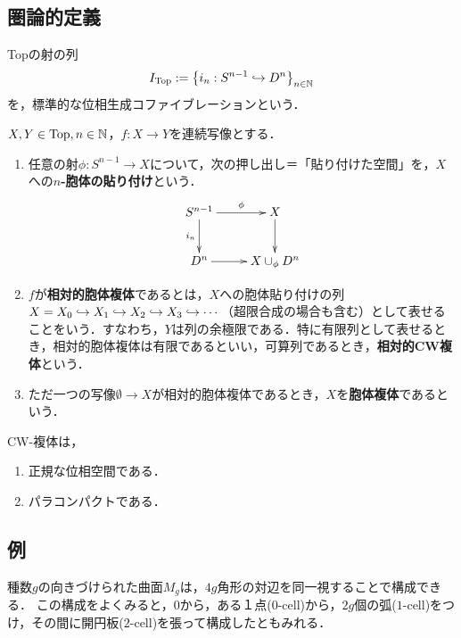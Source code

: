 \documentclass[uplatex,dvipdfmx]{jsreport}
\begin{document}
\subsection{圏論的定義}

\begin{notation}
    Topの射の列
    \[I_{\mathrm{Top}}:=\left\{i_n:S^{n-1}\hookrightarrow D^n\right\}_{n\in\mathbb{N}}\]
    を，標準的な位相生成コファイブレーションという．
\end{notation}

\begin{definition}
    $X,Y\in\mathrm{Top},n\in\mathbb{N}$，$f:X\to Y$を連続写像とする．
    \begin{enumerate}
        \item 任意の射$\phi:S^{n-1}\to X$について，次の押し出し＝「貼り付けた空間」を，$X$への\textbf{$n$-胞体の貼り付け}という．
        \[\xymatrix{
            S^{n-1}\ar[r]^-{\phi}\ar[d]_-{i_n}&X\ar[d]\\
            D^n\ar[r]&X\cup_\phi D^n
        }\]
        \item $f$が\textbf{相対的胞体複体}であるとは，$X$への胞体貼り付けの列$X=X_0\hookrightarrow X_1\hookrightarrow X_2\hookrightarrow X_3\hookrightarrow\cdots$（超限合成の場合も含む）として表せることをいう．すなわち，$Y$は列の余極限である．特に有限列として表せるとき，相対的胞体複体は有限であるといい，可算列であるとき，\textbf{相対的CW複体}という．
        \item ただ一つの写像$\emptyset\to X$が相対的胞体複体であるとき，$X$を\textbf{胞体複体}であるという．
    \end{enumerate}
\end{definition}

\begin{lemma}
    CW-複体は，
    \begin{enumerate}
        \item 正規な位相空間である．
        \item パラコンパクトである．
    \end{enumerate}
\end{lemma}

\subsection{例}

\begin{example}[torusの一般化]
    種数$g$の向きづけられた曲面$M_g$は，$4g$角形の対辺を同一視することで構成できる．
    この構成をよくみると，$0$から，ある１点($0$-cell)から，$2g$個の弧($1$-cell)をつけ，その間に開円板($2$-cell)を張って構成したともみれる．
\end{example}
\end{document}
